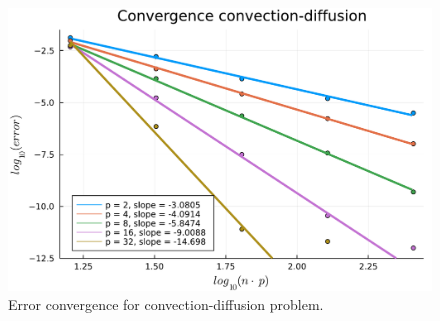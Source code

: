 \documentclass[aps, 12pt]{revtex4}
\begin{document}
\begin{figure}
    \includegraphics[width=0.75\linewidth]{conv_diff.pdf}
    \caption{Error convergence for convection-diffusion problem. }
    \label{fig_convdiff_errors}
\end{figure}
\end{document}
